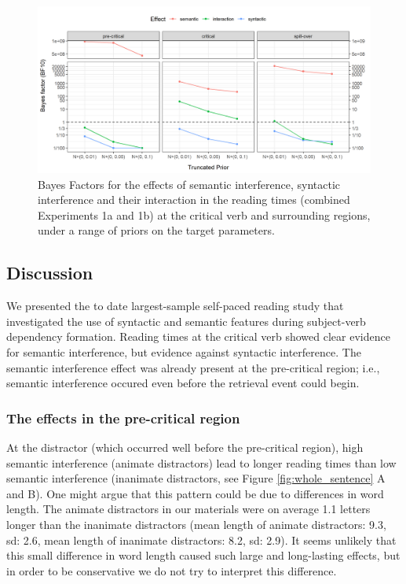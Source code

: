 \documentclass[a4paper, man, floatsintext]{apa7}
\begin{document}
\begin{figure}[H]
    \caption{Bayes Factors for the effects of semantic interference, syntactic interference and their interaction in the reading times (combined Experiments 1a and 1b) at the critical verb and surrounding regions, under a range of priors on the target parameters.}
    \label{fig:spr_bfs}
    \centering
    \includegraphics[width=\textwidth]{images/BF_plot_spr_774_allregions.png}
\end{figure}

\subsection{Discussion}
We presented the to date largest-sample self-paced reading study that investigated the use of syntactic and semantic features during subject-verb dependency formation. Reading times at the critical verb showed clear evidence for semantic interference, but evidence against syntactic interference. The semantic interference effect was already present at the pre-critical region; i.e., semantic interference occured even before the retrieval event could begin. 

\subsubsection{The effects in the pre-critical region}

At the distractor (which occurred well before the pre-critical region), high semantic interference (animate distractors) lead to longer reading times than low semantic interference (inanimate distractors, see Figure \ref{fig:whole_sentence} A and B). One might argue that this pattern could be due to differences in word length. The animate distractors in our materials were on average 1.1 letters longer than the inanimate distractors (mean length of animate distractors: 9.3, sd: 2.6, mean length of inanimate distractors: 8.2, sd: 2.9). It seems unlikely that this small difference in word length caused such large and long-lasting effects, but in order to be conservative we do not try to interpret this difference.
\end{document}
